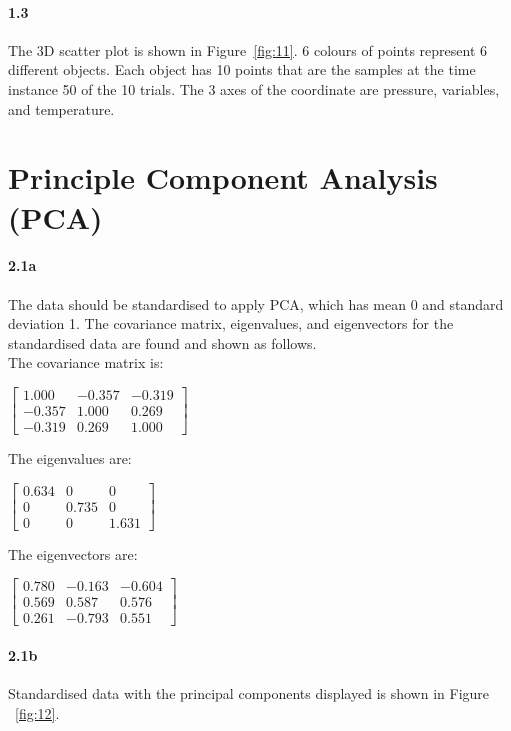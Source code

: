 \documentclass[10pt,twocolumn,letterpaper]{article}
\begin{document}
\paragraph{1.3}
The 3D scatter plot is shown in Figure~\ref{fig:11}. 6 colours of points represent 6 different objects. Each object has 10 points that are the samples at the time instance 50 of the 10 trials. The 3 axes of the coordinate are pressure, variables, and temperature.


\section{Principle Component Analysis (PCA)}
\paragraph{2.1a} The data should be standardised to apply PCA, which has mean 0 and standard deviation 1. The covariance matrix, eigenvalues, and eigenvectors for the standardised data are found and shown as follows.\\

\noindent The covariance matrix is:
\begin{center}
$\begin{bmatrix}
1.000 & -0.357 & -0.319 \\ 
-0.357 & 1.000 & 0.269\\ 
-0.319 & 0.269 & 1.000
\end{bmatrix}$
\end{center}

\noindent The eigenvalues are:
\begin{center}
$
\begin{bmatrix}
0.634 & 0 & 0 \\ 
0 & 0.735 & 0\\ 
0 & 0 & 1.631
\end{bmatrix} $
\end{center}

\noindent The eigenvectors are:
\begin{center}
$\begin{bmatrix}
0.780 & -0.163 & -0.604 \\ 
0.569 & 0.587 & 0.576\\ 
0.261 & -0.793 & 0.551
\end{bmatrix}$
\end{center}


\paragraph{2.1b}
Standardised data with the principal components displayed is shown in Figure ~\ref{fig:12}.
\end{document}
